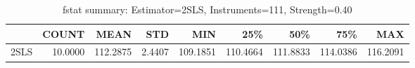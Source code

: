 \begin{table}[ht]
\centering
\caption{fstat summary: Estimator=2SLS, Instruments=111, Strength=0.40}
\begin{tabular}{lrrrrrrrr}
\toprule
 & COUNT & MEAN & STD & MIN & 25\% & 50\% & 75\% & MAX \\
\midrule
2SLS & 10.0000 & 112.2875 & 2.4407 & 109.1851 & 110.4664 & 111.8833 & 114.0386 & 116.2091 \\
\bottomrule
\end{tabular}
\end{table}
